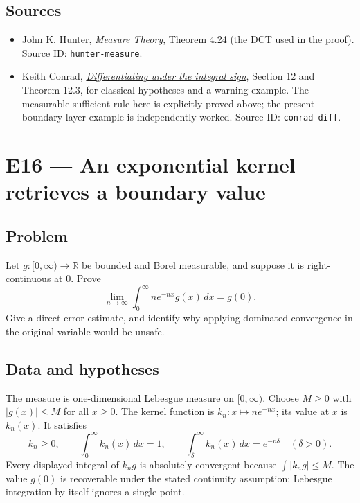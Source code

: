 \documentclass[
  11pt,
]{article}
\providecommand{\tightlist}{%
  \setlength{\itemsep}{0pt}\setlength{\parskip}{0pt}}
\begin{document}
\subsection{Sources}\label{sources-14}

\begin{itemize}
\tightlist
\item
  John K. Hunter,
  \href{https://www.math.ucdavis.edu/~hunter/measure_theory/measure_notes.pdf}{\emph{Measure
  Theory}}, Theorem 4.24 (the DCT used in the proof). Source ID:
  \texttt{hunter-\allowbreak{}measure}.
\item
  Keith Conrad,
  \href{https://kconrad.math.uconn.edu/blurbs/analysis/diffunderint.pdf}{\emph{Differentiating
  under the integral sign}}, Section 12 and Theorem 12.3, for classical
  hypotheses and a warning example. The measurable sufficient rule here
  is explicitly proved above; the present boundary-layer example is
  independently worked. Source ID: \texttt{conrad-\allowbreak{}diff}.
\end{itemize}

\section{E16 --- An exponential kernel retrieves a boundary
value}\label{E16}

\subsection{Problem}\label{problem-15}

Let \(g:[0,\infty)\to\mathbb R\) be bounded and Borel measurable, and
suppose it is right-continuous at \(0\). Prove \[
\lim_{n\to\infty}\int_0^{\infty}ne^{-nx}g(x)\,dx=g(0).
\] Give a direct error estimate, and identify why applying dominated
convergence in the original variable would be unsafe.

\subsection{Data and hypotheses}\label{data-and-hypotheses-15}

The measure is one-dimensional Lebesgue measure on \([0,\infty)\).
Choose \(M\ge0\) with \(|g(x)|\le M\) for all \(x\ge0\). The kernel
function is \(k_n:x\mapsto ne^{-nx}\); its value at \(x\) is \(k_n(x)\).
It satisfies \[
k_n\ge0,\qquad\int_0^{\infty}k_n(x)\,dx=1,\qquad
\int_\delta^{\infty}k_n(x)\,dx=e^{-n\delta}\quad(\delta>0).
\] Every displayed integral of \(k_ng\) is absolutely convergent because
\(\int|k_ng|\le M\). The value \(g(0)\) is recoverable under the stated
continuity assumption; Lebesgue integration by itself ignores a single
point.
\end{document}
